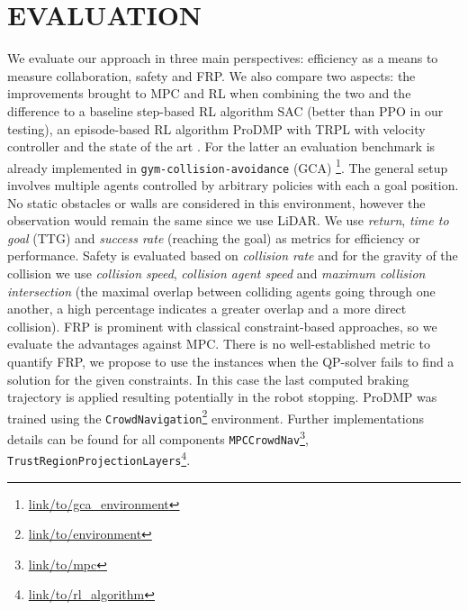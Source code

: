 \documentclass[letterpaper,conference,10pt]{IEEEconf}
\begin{document}
\section{EVALUATION}\label{sec:eval}

We evaluate our approach in three main perspectives: efficiency as a means to measure collaboration, safety and FRP. We also compare two aspects: the improvements brought to MPC and RL when combining the two and the difference to a baseline step-based RL algorithm SAC \cite{haarnojaZAL18} (better than PPO in our testing), an episode-based RL algorithm ProDMP with TRPL with velocity controller and the state of the art \cite{everett_collision_2021}. For the latter an evaluation benchmark is already implemented in \verb!gym-collision-avoidance! (GCA) \footnote{\url{link/to/gca_environment}}. The general setup involves multiple agents controlled by arbitrary policies with each a goal position. No static obstacles or walls are considered in this environment, however the observation would remain the same since we use LiDAR. We use \textit{return}, \textit{time to goal} (TTG) and \textit{success rate} (reaching the goal) as metrics for efficiency or performance. Safety is evaluated based on \textit{collision rate} and for the gravity of the collision we use \textit{collision speed}, \textit{collision agent speed} and \textit{maximum collision intersection} (the maximal overlap between colliding agents going through one another, a high percentage indicates a greater overlap and a more direct collision). FRP is prominent with classical constraint-based approaches, so we evaluate the advantages against MPC. There is no well-established metric to quantify FRP, we propose to use the instances when the QP-solver fails to find a solution for the given constraints. In this case the last computed braking trajectory is applied resulting potentially in the robot stopping. ProDMP was trained using the \verb!CrowdNavigation!\footnote{\url{link/to/environment}} environment. Further implementations details can be found for all components \verb!MPCCrowdNav!\footnote{\url{link/to/mpc}}, \verb!TrustRegionProjectionLayers!\footnote{\url{link/to/rl_algorithm}}.
\end{document}
